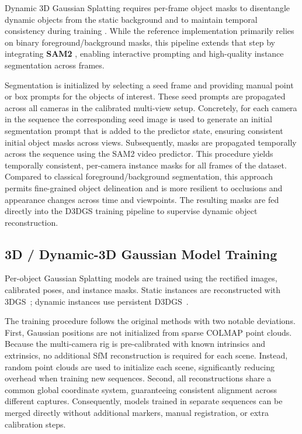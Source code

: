 Dynamic 3D Gaussian Splatting requires per-frame object masks to disentangle dynamic objects from the static background and to maintain temporal consistency during training \cite{luiten2024dynamic}. While the reference implementation primarily relies on binary foreground/background masks, this pipeline extends that step by integrating \textbf{SAM2} \cite{ravi2024sam2}, enabling interactive prompting and high-quality instance segmentation across frames.

Segmentation is initialized by selecting a seed frame and providing manual point or box prompts for the objects of interest. These seed prompts are propagated across all cameras in the calibrated multi-view setup. Concretely, for each camera in the sequence the corresponding seed image is used to generate an initial segmentation prompt that is added to the predictor state, ensuring consistent initial object masks across views. Subsequently, masks are propagated temporally across the sequence using the SAM2 video predictor. This procedure yields temporally consistent, per-camera instance masks for all frames of the dataset. Compared to classical foreground/background segmentation, this approach permits fine-grained object delineation and is more resilient to occlusions and appearance changes across time and viewpoints. The resulting masks are fed directly into the D3DGS training pipeline to supervise dynamic object reconstruction.

\subsection{3D / Dynamic-3D Gaussian Model Training}
\label{sec:modeltraining}

Per-object Gaussian Splatting models are trained using the rectified images, calibrated poses, and instance masks. Static instances are reconstructed with 3DGS~\cite{kerbl3Dgaussians}; dynamic instances use persistent D3DGS~\cite{luiten2024dynamic}. 

The training procedure follows the original methods with two notable deviations. First, Gaussian positions are not initialized from sparse COLMAP point clouds. Because the multi-camera rig is pre-calibrated with known intrinsics and extrinsics, no additional SfM reconstruction is required for each scene. Instead, random point clouds are used to initialize each scene, significantly reducing overhead when training new sequences. Second, all reconstructions share a common global coordinate system, guaranteeing consistent alignment across different captures. Consequently, models trained in separate sequences can be merged directly without additional markers, manual registration, or extra calibration steps.

